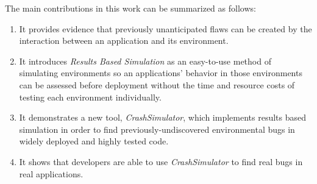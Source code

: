 
The main contributions in this work can be summarized as follows:

\begin{enumerate}

\item{It provides evidence
that previously unanticipated flaws can be created by the interaction
between an application and its environment.}

\item{It introduces \textit{Results Based Simulation}
as an easy-to-use method of simulating environments
so an applications' behavior in those environments
can be assessed before deployment
without the time and resource costs of
testing each environment individually.}

\item{It demonstrates a new tool, {\em CrashSimulator},
which implements results based simulation
in order to find previously-undiscovered environmental bugs
in widely deployed and highly tested code.}

\item{It shows that developers are able
to use {\em CrashSimulator}
to find real bugs in real applications.}

\end{enumerate}
